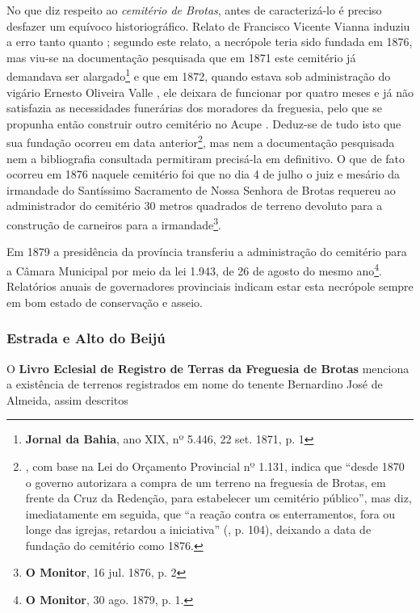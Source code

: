 No que diz respeito ao \textit{cemitério de Brotas}, antes de caracterizá-lo é preciso desfazer um equívoco historiográfico. Relato de Francisco Vicente Vianna \cite[p.~371]{vianna_bahia_1893} induziu a erro tanto  quanto ; segundo este relato, a necrópole teria sido fundada em 1876, mas viu-se na documentação pesquisada que em 1871 este cemitério já demandava ser alargado\footnote{\textbf{Jornal da Bahia}, ano XIX, nº 5.446, 22 set. 1871, p. 1} e que em 1872, quando estava sob administração do vigário Ernesto Oliveira Valle \cite[segunda~parte, p.~105]{pimenta_almanak_1872}, ele deixara de funcionar por quatro meses e já não satisfazia as necessidades funerárias dos moradores da freguesia, pelo que se propunha então construir outro cemitério no Acupe \cite[relatório do chefe de polícia, p.~12]{bahia_1872}. Deduz-se de tudo isto que sua fundação ocorreu em data anterior\footnote{, com base na Lei do Orçamento Provincial nº 1.131, indica que ``desde 1870 o governo autorizara a compra de um terreno na freguesia de Brotas, em frente da Cruz da Redenção, para estabelecer um cemitério público'', mas diz, imediatamente em seguida, que ``a reação contra os enterramentos, fora ou longe das igrejas, retardou a iniciativa'' (\citeyear{flexor_desenho_1999}, p. 104), deixando a data de fundação do cemitério como 1876.}, mas nem a documentação pesquisada nem a bibliografia consultada permitiram precisá-la em definitivo. O que de fato ocorreu em 1876 naquele cemitério foi que no dia 4 de julho o juiz e mesário da irmandade do Santíssimo Sacramento de Nossa Senhora de Brotas requereu ao administrador do cemitério 30 metros quadrados de terreno devoluto para a construção de carneiros para a irmandade\footnote{\textbf{O Monitor}, 16 jul. 1876, p. 2}. 

Em 1879 a presidência da província transferiu a administração do cemitério para a Câmara Municipal por meio da lei 1.943, de 26 de agosto do mesmo ano\footnote{\textbf{O Monitor}, 30 ago. 1879, p. 1.}. Relatórios anuais de governadores provinciais indicam estar esta necrópole sempre em bom estado de conservação e asseio.

\subsubsection{Estrada e Alto do Beijú}



O \textbf{Livro Eclesial de Registro de Terras da Freguesia de Brotas} menciona a existência de terrenos registrados em nome do tenente Bernardino José de Almeida, assim descritos

